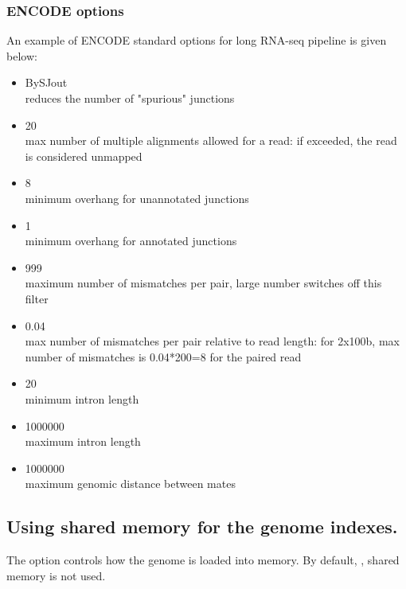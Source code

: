 \documentclass[12pt]{article}
\begin{document}
\subsubsection{ENCODE options}
An example of ENCODE standard options for long RNA-seq pipeline is given below:
\begin{itemize}
\item[]
              BySJout\\
reduces the number of "spurious" junctions
\item[]
      20\\
max number of multiple alignments allowed for a read: if exceeded, the read is considered unmapped
\item[]
         8\\
minimum overhang for unannotated junctions
\item[]
       1\\
minimum overhang for annotated junctions
\item[]
      999\\
maximum number of mismatches per pair, large number switches off this filter
\item[]
 0.04\\
max number of mismatches per pair relative to read length: for 2x100b, max number of mismatches is 0.04*200=8 for the paired read
\item[]
             20\\
minimum intron length
\item[]
             1000000\\
maximum intron length
\item[]
           1000000\\
maximum genomic distance between mates
\end{itemize}

\subsection{Using shared memory for the genome indexes.}
The  option controls how the genome is loaded into memory. By default,  , shared memory is not used.
\end{document}
